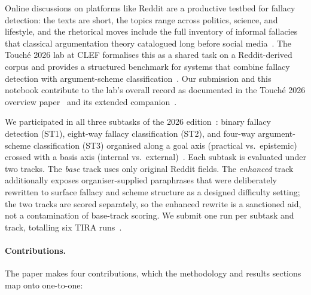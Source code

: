 Online discussions on platforms like Reddit are a productive testbed for fallacy detection: the texts are short, the topics range across politics, science, and lifestyle, and the rhetorical moves include the full inventory of informal fallacies that classical argumentation theory catalogued long before social media~\cite{sahai2021invisiblewall,walton2008schemes}. The Touch\'{e} 2026 lab at CLEF formalises this as a shared task on a Reddit-derived corpus and provides a structured benchmark for systems that combine fallacy detection with argument-scheme classification~\cite{kiesel:2026c}.
Our submission and this notebook contribute to the lab's overall record as documented in the Touch\'{e} 2026 overview paper~\cite{kiesel:2026c} and its extended companion~\cite{kiesel:2026d}.

We participated in all three subtasks of the 2026 edition~\cite{kiesel:2026c}: binary fallacy detection (ST1), eight-way fallacy classification (ST2), and four-way argument-scheme classification (ST3) organised along a goal axis (practical vs.\ epistemic) crossed with a basis axis (internal vs.\ external)~\cite{macagno2022argumentation}. Each subtask is evaluated under two tracks. The \emph{base} track uses only original Reddit fields. The \emph{enhanced} track additionally exposes organiser-supplied paraphrases that were deliberately rewritten to surface fallacy and scheme structure as a designed difficulty setting; the two tracks are scored separately, so the enhanced rewrite is a sanctioned aid, not a contamination of base-track scoring. We submit one run per subtask and track, totalling six TIRA runs~\cite{froebe:2023}.

\paragraph{Contributions.} The paper makes four contributions, which the methodology and results sections map onto one-to-one:

